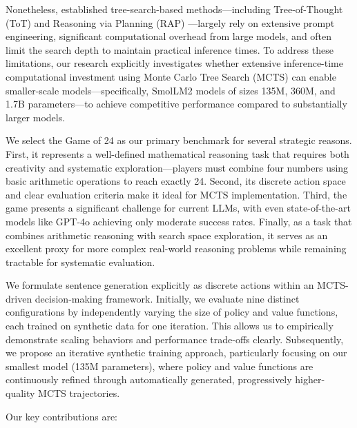 \documentclass{article}
\begin{document}
Nonetheless, established tree-search-based methods—including Tree-of-Thought (ToT) \cite{yao2023tree} and Reasoning via Planning (RAP) \cite{hao2023reasoning}—largely rely on extensive prompt engineering, significant computational overhead from large models, and often limit the search depth to maintain practical inference times. To address these limitations, our research explicitly investigates whether extensive inference-time computational investment using Monte Carlo Tree Search (MCTS) can enable smaller-scale models—specifically, SmolLM2 models of sizes 135M, 360M, and 1.7B parameters—to achieve competitive performance compared to substantially larger models.

We select the Game of 24 as our primary benchmark for several strategic reasons. First, it represents a well-defined mathematical reasoning task that requires both creativity and systematic exploration—players must combine four numbers using basic arithmetic operations to reach exactly 24. Second, its discrete action space and clear evaluation criteria make it ideal for MCTS implementation. Third, the game presents a significant challenge for current LLMs, with even state-of-the-art models like GPT-4o achieving only moderate success rates. Finally, as a task that combines arithmetic reasoning with search space exploration, it serves as an excellent proxy for more complex real-world reasoning problems while remaining tractable for systematic evaluation.

We formulate sentence generation explicitly as discrete actions within an MCTS-driven decision-making framework. Initially, we evaluate nine distinct configurations by independently varying the size of policy and value functions, each trained on synthetic data for one iteration. This allows us to empirically demonstrate scaling behaviors and performance trade-offs clearly. Subsequently, we propose an iterative synthetic training approach, particularly focusing on our smallest model (135M parameters), where policy and value functions are continuously refined through automatically generated, progressively higher-quality MCTS trajectories.

Our key contributions are:
\end{document}
